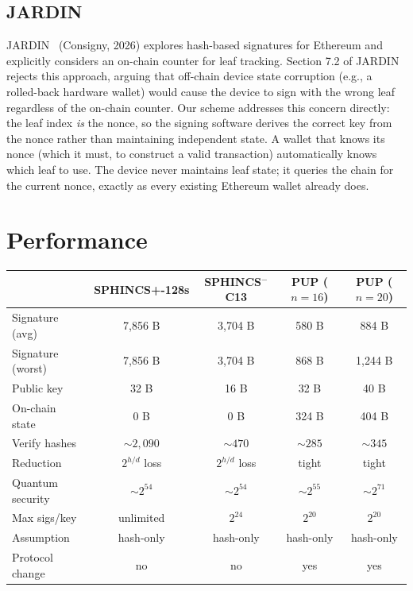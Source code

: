 \documentclass[11pt]{article}
\begin{document}
\subsection{JARDIN}

JARDIN~\cite{jardin} (Consigny, 2026) explores hash-based signatures
for Ethereum and explicitly considers an on-chain counter for leaf
tracking. Section 7.2 of JARDIN rejects this approach, arguing that
off-chain device state corruption (e.g., a rolled-back hardware wallet)
would cause the device to sign with the wrong leaf regardless of the
on-chain counter. Our scheme addresses this concern directly: the leaf
index \emph{is} the nonce, so the signing software derives the correct
key from the nonce rather than maintaining independent state. A wallet
that knows its nonce (which it must, to construct a valid transaction)
automatically knows which leaf to use. The device never maintains leaf
state; it queries the chain for the current nonce, exactly as every
existing Ethereum wallet already does.

\section{Performance}

\begin{center}
\begin{tabular}{lcccc}
\toprule
 & SPHINCS+-128s & SPHINCS$^-$ C13 & PUP ($n{=}16$) & PUP ($n{=}20$) \\
\midrule
Signature (avg) & 7,856 B & 3,704 B & 580 B & 884 B \\
Signature (worst) & 7,856 B & 3,704 B & 868 B & 1,244 B \\
Public key & 32 B & 16 B & 32 B & 40 B \\
On-chain state & 0 B & 0 B & 324 B & 404 B \\
Verify hashes & ${\sim}2{,}090$ & ${\sim}470$ & ${\sim}285$ & ${\sim}345$ \\
Reduction & $2^{h/d}$ loss & $2^{h/d}$ loss & tight & tight \\
Quantum security & ${\sim}2^{54}$ & ${\sim}2^{54}$ & ${\sim}2^{55}$ & ${\sim}2^{71}$ \\
Max sigs/key & unlimited & $2^{24}$ & $2^{20}$ & $2^{20}$ \\
Assumption & hash-only & hash-only & hash-only & hash-only \\
Protocol change & no & no & yes & yes \\
\bottomrule
\end{tabular}
\end{center}
\end{document}
